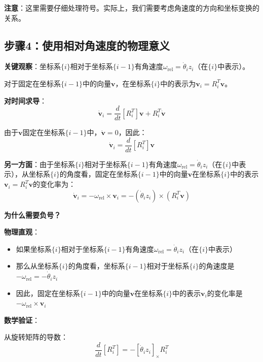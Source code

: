 \documentclass[12pt,a4paper]{article}
\begin{document}
\textbf{注意}：这里需要仔细处理符号。实际上，我们需要考虑角速度的方向和坐标变换的关系。

\subsection{步骤4：使用相对角速度的物理意义}

\textbf{关键观察}：坐标系$\{i\}$相对于坐标系$\{i-1\}$有角速度$\omega_{\text{rel}} = \dot{\theta}_i z_i$（在$\{i\}$中表示）。

对于固定在坐标系$\{i-1\}$中的向量$\mathbf{v}$，在坐标系$\{i\}$中的表示为$\mathbf{v}_i = R_i^T \mathbf{v}$。

\textbf{对时间求导}：
\begin{equation}
\dot{\mathbf{v}}_i = \frac{d}{dt}[R_i^T] \mathbf{v} + R_i^T \dot{\mathbf{v}}
\end{equation}

由于$\mathbf{v}$固定在坐标系$\{i-1\}$中，$\dot{\mathbf{v}} = 0$，因此：
\begin{equation}
\dot{\mathbf{v}}_i = \frac{d}{dt}[R_i^T] \mathbf{v}
\end{equation}

\textbf{另一方面}：由于坐标系$\{i\}$相对于坐标系$\{i-1\}$有角速度$\omega_{\text{rel}} = \dot{\theta}_i z_i$（在$\{i\}$中表示），从坐标系$\{i\}$的角度看，固定在坐标系$\{i-1\}$中的向量$\mathbf{v}$在坐标系$\{i\}$中的表示$\mathbf{v}_i = R_i^T \mathbf{v}$的变化率为：
\begin{equation}
\dot{\mathbf{v}}_i = -\omega_{\text{rel}} \times \mathbf{v}_i = -(\dot{\theta}_i z_i) \times (R_i^T \mathbf{v})
\end{equation}

\textbf{为什么需要负号？}

\textbf{物理直观}：
\begin{itemize}
\item 如果坐标系$\{i\}$相对于坐标系$\{i-1\}$有角速度$\omega_{\text{rel}} = \dot{\theta}_i z_i$（在$\{i\}$中表示）
\item 那么从坐标系$\{i\}$的角度看，坐标系$\{i-1\}$相对于坐标系$\{i\}$的角速度是$-\omega_{\text{rel}} = -\dot{\theta}_i z_i$
\item 因此，固定在坐标系$\{i-1\}$中的向量$\mathbf{v}$在坐标系$\{i\}$中的表示$\mathbf{v}_i$的变化率是$-\omega_{\text{rel}} \times \mathbf{v}_i$
\end{itemize}

\textbf{数学验证}：

从旋转矩阵的导数：
\begin{equation}
\frac{d}{dt}[R_i^T] = -[\dot{\theta}_i z_i]_{\times} R_i^T
\end{equation}
\end{document}
